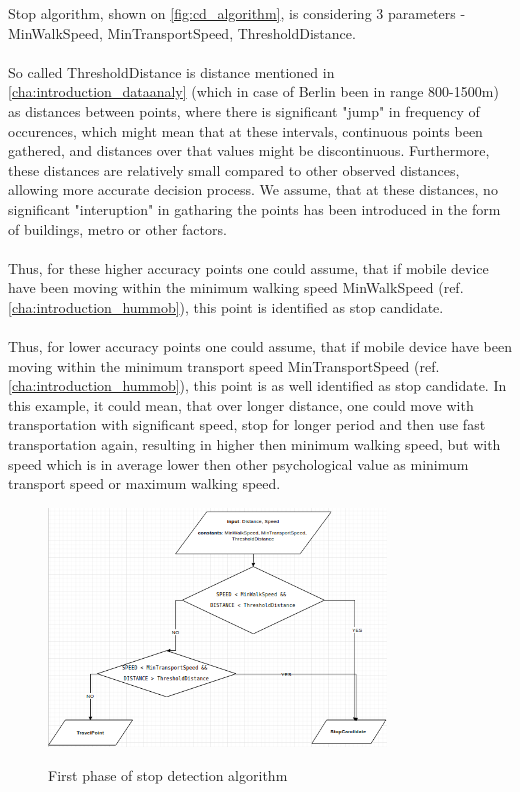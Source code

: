 Stop algorithm, shown on \autoref{fig:cd_algorithm}, is considering 3 parameters - MinWalkSpeed, MinTransportSpeed, ThresholdDistance. 
\\\\
So called ThresholdDistance is distance mentioned in \autoref{cha:introduction_dataanaly} (which in case of Berlin been in range 800-1500m) as distances between points, where there is significant "jump" in frequency of occurences, which might mean that at these intervals, continuous points been gathered, and distances over that values might be discontinuous. Furthermore, these distances are relatively small compared to other observed distances, allowing more accurate decision process. We assume, that at these distances, no significant "interuption" in gatharing the points has been introduced in the form of buildings, metro or other factors.
\\\\
Thus, for these higher accuracy points one could assume, that if mobile device have been moving within the minimum walking speed MinWalkSpeed (ref. \autoref{cha:introduction_hummob}), this point is identified as stop candidate. 
\\\\
Thus, for lower accuracy points one could assume, that if mobile device have been moving within the minimum transport speed MinTransportSpeed (ref. \autoref{cha:introduction_hummob}), this point is as well identified as stop candidate. In this example, it could mean, that over longer distance, one could move with transportation with significant speed, stop for longer period and then use fast transportation again, resulting in higher then minimum walking speed, but with speed which is in average lower then other psychological value as minimum transport speed or maximum walking speed.
\begin{figure}[!ht]
	\centering
	\includegraphics[width=0.8\textwidth]{images/stop_algorithm_1.png}\\
	\caption{First phase of stop detection algorithm  }
	\label{fig:cd_algorithm}
\end{figure}

